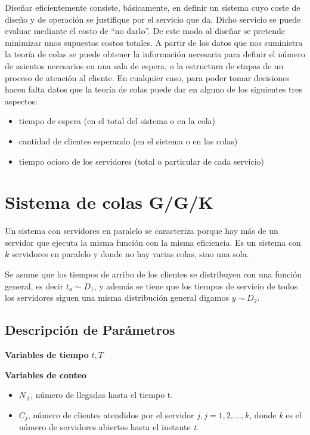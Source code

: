 \documentclass[]{article}
\providecommand{\tightlist}{%
  \setlength{\itemsep}{0pt}\setlength{\parskip}{0pt}}
\begin{document}
Diseñar eficientemente consiste, básicamente, en definir un sistema cuyo
coste de diseño y de operación se justifique por el servicio que da.
Dicho servicio se puede evaluar mediante el costo de ``no darlo''. De
este modo al diseñar se pretende minimizar unos supuestos costos
totales. A partir de los datos que nos suministra la teoría de colas se
puede obtener la información necesaria para definir el número de
asientos necesarios en una sala de espera, o la estructura de etapas de
un proceso de atención al cliente. En cualquier caso, para poder tomar
decisiones hacen falta datos que la teoría de colas puede dar en alguno
de los siguientes tres aspectos:

\begin{itemize}
\tightlist
\item
  tiempo de espera (en el total del sistema o en la cola)
\item
  cantidad de clientes esperando (en el sistema o en las colas)
\item
  tiempo ocioso de los servidores (total o particular de cada servicio)
\end{itemize}

\clearpage

\section{Sistema de colas G/G/K}\label{sistema-de-colas-ggk}

Un sistema con servidores en paralelo se caracteriza porque hay más de
un servidor que ejecuta la misma función con la misma eficiencia. Es un
sistema con \(k\) servidores en paralelo y donde no hay varias colas,
sino una sola.

Se asume que los tiempos de arribo de los clientes se distribuyen con
una función general, es decir \(t_a \sim D_1\), y además se tiene que
los tiempos de servicio de todos los servidores siguen una misma
distribución general digamos \(y \sim D_2\).

\subsection{Descripción de Parámetros}\label{descripcion-de-parametros}

\textbf{Variables de tiempo} \(t,T\)

\textbf{Variables de conteo}

\begin{itemize}
\tightlist
\item
  \(N_{A}\), número de llegadas hasta el tiempo t.
\item
  \(C_{j}\), número de clientes atendidos por el servidor
  \(j, j=1,2,...,k\), donde \textit{k} es el número de servidores
  abiertos hasta el instante \textit{t}.
\end{itemize}
\end{document}
